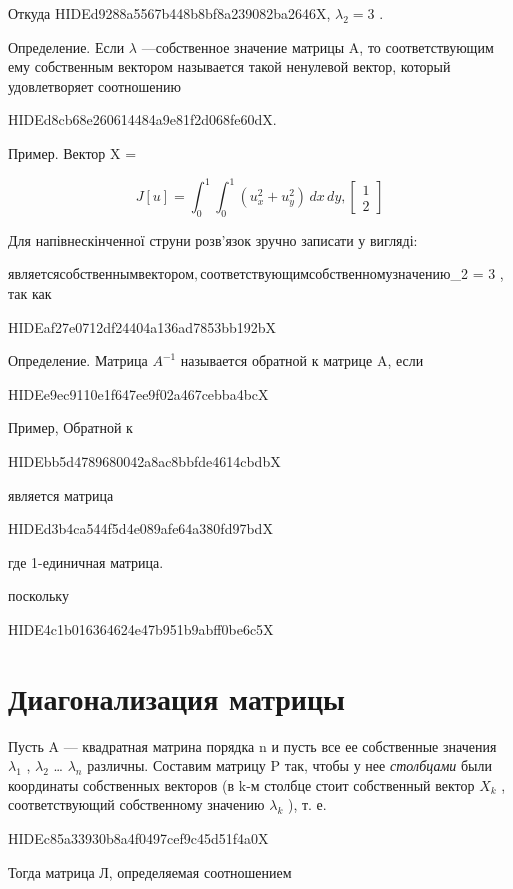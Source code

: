 \documentclass[
  ukrainian,
]{article}
\begin{document}
Откуда HIDEd9288a5567b448b8bf8a239082ba2646X, \(\lambda_2 = 3\) .

Определение. Если \(\lambda\) ---собственное значение матрицы A, то
соответствующим ему собственным вектором называется такой ненулевой
вектор, который удовлетворяет соотношению

HIDEd8cb68e260614484a9e81f2d068fe60dX.

Пример. Вектор X =

\[
J[u] = \int_{0}^{1} \int_{0}^{1} (u_{x}^{2} + u_{y}^{2})\,dx\,dy,
\begin{bmatrix} 1 \\ 2 \end{bmatrix}
\]

Для напівнескінченної струни розв'язок зручно записати у вигляді:

\(является собственным вектором, соответствующим собственному значению\)\lambda\_2
= 3 , так как

HIDEaf27e0712df24404a136ad7853bb192bX

Определение. Матрица \(A^{-1}\) называется обратной к матрице A, если

HIDEe9ec9110e1f647ee9f02a467cebba4bcX

Пример, Обратной к

HIDEbb5d4789680042a8ac8bbfde4614cbdbX

является матрица

HIDEd3b4ca544f5d4e089afe64a380fd97bdX

где 1-единичная матрица.

поскольку

HIDE4c1b016364624e47b951b9abff0be6c5X

\section{Диагонализация
матрицы}\label{ux434ux438ux430ux433ux43eux43dux430ux43bux438ux437ux430ux446ux438ux44f-ux43cux430ux442ux440ux438ux446ux44b}

Пусть A --- квадратная матрина порядка n и пусть все ее собственные
значения \(\lambda_1\) , \(\lambda_2\) \ldots{} \(\lambda_n\) различны.
Составим матрицу P так, чтобы у нее \emph{столбцами} были координаты
собственных векторов (в k-м столбце стоит собственный вектор \(X_k\) ,
соответствующий собственному значению \(\lambda_k\) ), т. е.

HIDEc85a33930b8a4f0497cef9c45d51f4a0X

Тогда матрица Л, определяемая соотношением
\end{document}
